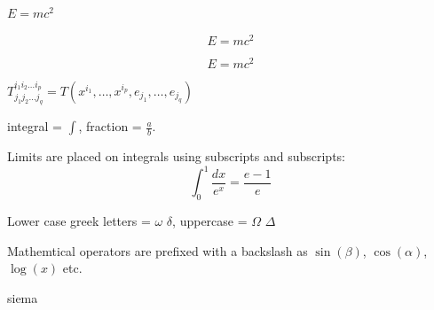 \documentclass[12pt, a4paper]{article} %
\begin{document}
\begin{math}
	E=mc^2	
\end{math}

\[E=mc^2\] 

\begin{equation}
	E=mc^2
\end{equation}

\begin{math}
	T^{i_1 i_2 \dots i_p}_{j_1 j_2 \dots j_q} = T(x^{i_1}, \dots, x^{i_p}, e_{j_1}, \dots, e_{j_q})
\end{math}

\vspace{5mm}

integral = $\int$, fraction = $\frac{a}{b}$.

Limits are placed on integrals using subscripts and subscripts:
\[ \int_0^1 \frac{dx}{e^x} = \frac{e-1}{e}\]

Lower case greek letters = $\omega$ $\delta$, uppercase = $\Omega$ $\Delta$

Mathemtical operators are prefixed with a backslash as $\sin(\beta)$, $\cos(\alpha)$, $\log(x)$ etc.

siema
\end{document}
